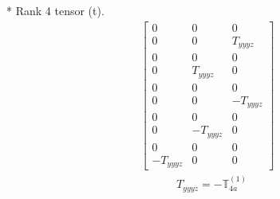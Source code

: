 \documentclass[fleqn,8pt,landscape]{jsarticle}
\begin{document}
* Rank 4 tensor (t).
\begin{align*}
\begin{bmatrix} 0 & 0 & 0 \\ 0 & 0 & T_{yyyz} \\ 0 & 0 & 0 \\ 0 & T_{yyyz} & 0 \\ 0 & 0 & 0 \\ 0 & 0 & - T_{yyyz} \\ 0 & 0 & 0 \\ 0 & - T_{yyyz} & 0 \\ 0 & 0 & 0 \\ - T_{yyyz} & 0 & 0 \end{bmatrix}
\end{align*}
\begin{align*}
& T_{yyyz} = - \mathbb{T}_{4a}^{(1)}
\end{align*}
\end{document}
